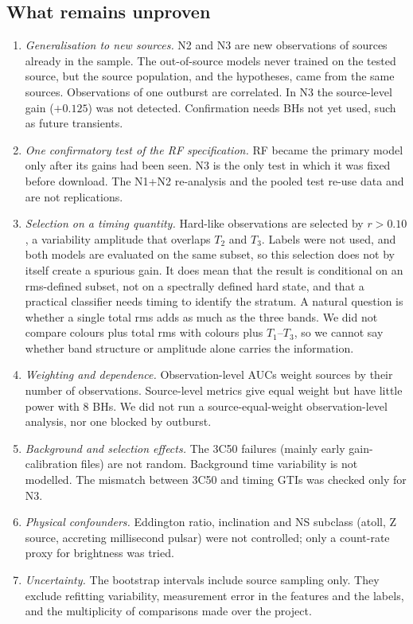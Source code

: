 \documentclass[11pt,a4paper]{article}
\begin{document}
\subsection{What remains unproven}\label{sec:unproven}
\begin{enumerate}\setlength\itemsep{2pt}
\item \emph{Generalisation to new sources.} N2 and N3 are new observations of sources already in the sample. The
out-of-source models never trained on the tested source, but the source population, and the hypotheses, came from the
same sources. Observations of one outburst are correlated. In N3 the source-level gain ($+0.125$) was not detected.
Confirmation needs BHs not yet used, such as future transients.
\item \emph{One confirmatory test of the RF specification.} RF became the primary model only after its gains had been
seen. N3 is the only test in which it was fixed before download. The N1+N2 re-analysis and the pooled test re-use data
and are not replications.
\item \emph{Selection on a timing quantity.} Hard-like observations are selected by $r>0.10$, a variability amplitude
that overlaps $T_2$ and $T_3$. Labels were not used, and both models are evaluated on the same subset, so this selection
does not by itself create a spurious gain. It does mean that the result is conditional on an rms-defined subset, not on a
spectrally defined hard state, and that a practical classifier needs timing to identify the stratum. A natural question
is whether a single total rms adds as much as the three bands. We did not compare colours plus total rms with colours
plus $T_1$--$T_3$, so we cannot say whether band structure or amplitude alone carries the information.
\item \emph{Weighting and dependence.} Observation-level AUCs weight sources by their number of observations. Source-level
metrics give equal weight but have little power with 8 BHs. We did not run a source-equal-weight observation-level
analysis, nor one blocked by outburst.
\item \emph{Background and selection effects.} The 3C50 failures (mainly early gain-calibration files) are not random.
Background time variability is not modelled. The mismatch between 3C50 and timing GTIs was checked only for N3.
\item \emph{Physical confounders.} Eddington ratio, inclination and NS subclass (atoll, Z source, accreting millisecond
pulsar) were not controlled; only a count-rate proxy for brightness was tried.
\item \emph{Uncertainty.} The bootstrap intervals include source sampling only. They exclude refitting variability,
measurement error in the features and the labels, and the multiplicity of comparisons made over the project.
\end{enumerate}
\end{document}
